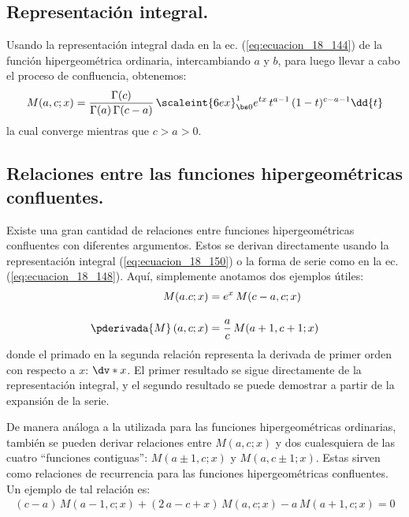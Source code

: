 \subsection{Representación integral.}

Usando la representación integral dada en la ec. (\ref{eq:ecuacion_18_144}) de la función hipergeométrica ordinaria, intercambiando $a$ y $b$, para luego llevar a cabo el proceso de confluencia, obtenemos:
\begin{align}
M(a, c; x) = \dfrac{\Gamma(c)}{\Gamma(a) \, \Gamma(c - a)} \, \scaleint{6ex}_{\bs 0}^{1} e^{t x} \, t^{a - 1} \, (1 - t)^{c-a-1} \dd{t}
\label{eq:ecuacion_18_150}
\end{align}
la cual converge mientras que $c > a > 0$.

\subsection{Relaciones entre las funciones hipergeométricas confluentes.}

Existe una gran cantidad de relaciones entre funciones hipergeométricas confluentes con diferentes argumentos. Estos se derivan directamente usando la representación integral (\ref{eq:ecuacion_18_150}) o la forma de serie como en la ec. (\ref{eq:ecuacion_18_148}). Aquí, simplemente anotamos dos ejemplos útiles:
\begin{align}
M(a. c; x) &= e^{x} \, M(c - a, c; x) \label{eq:ecuacion_18_151} \\[1em]
\pderivada{M} \, (a, c; x) &= \dfrac{a}{c} \, M(a + 1, c + 1; x) \label{eq:ecuacion_18_152}
\end{align}
donde el primado en la segunda relación representa la derivada de primer orden con respecto a $x$: $\dv*{x}$. El primer resultado se sigue directamente de la representación integral, y el segundo resultado se puede demostrar a partir de la expansión de la serie.
\par
De manera análoga a la utilizada para las funciones hipergeométricas ordinarias, también se pueden derivar relaciones entre $M (a, c; x)$ y dos cualesquiera de las cuatro \enquote{funciones contiguas}: $M (a \pm 1, c; x)$ y $M (a, c \pm 1; x)$. Estas sirven como relaciones de recurrencia para las funciones hipergeométricas confluentes. Un ejemplo de tal relación es:
\begin{align}
(c - a) \, M(a - 1, c; x) + (2 \, a - c + x) \, M(a, c; x) - a \, M(a + 1, c; x) = 0
\end{align}

